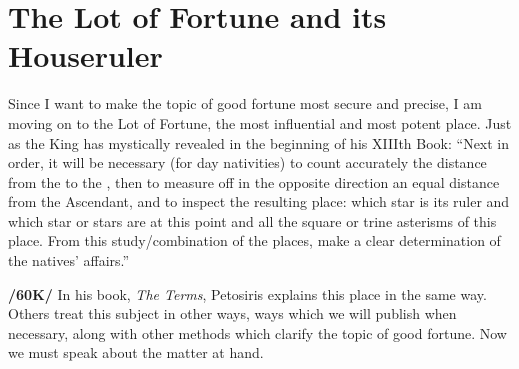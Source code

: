 \section{The Lot of Fortune and its Houseruler}
Since I want to make the topic of good fortune most secure and precise, I am moving on to the Lot of Fortune, the most influential and most potent place. Just as the King has mystically revealed in the beginning of his XIIIth Book: \mnt “Next in order, it will be necessary (for day nativities) to count accurately the distance from the \Sun\xspace to the \Moon, then to measure off in the opposite direction an equal distance from
the Ascendant, and to inspect the resulting place: which star is its ruler and which star or stars are at this point and all the square or trine asterisms of this place. From this study/combination of the places, make a clear determination of the natives’ affairs.”

\textbf{/60K/} In his book, \textit{The Terms}, Petosiris explains this place in the same way. Others treat this subject
in other ways, ways which we will publish when necessary, along with other methods which clarify the topic of good fortune. Now we must speak about the matter at hand.

\newpage